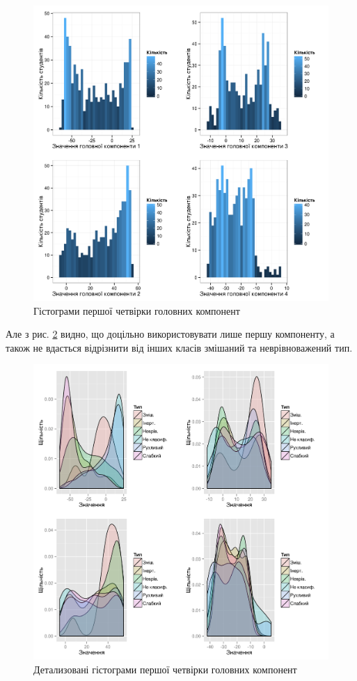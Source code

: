 \begin{figure}[h]
  \centering
    \includegraphics[width=\textwidth]{images/pca_hists}
  \caption{Гістограми першої четвірки головних компонент}
  \label{fig:pca:histograms}
\end{figure}
Але з рис. \ref{fig:pca:histograms:detailed} видно, що доцільно
використовувати лише першу компоненту, а також не вдасться відрізнити
від інших класів змішаний та неврівноважений тип.
\begin{figure}[h]
  \centering
    \includegraphics[width=\textwidth]{images/pca_hists_detailed}
  \caption{Детализовані гістограми першої четвірки головних компонент}
  \label{fig:pca:histograms:detailed}
\end{figure}

